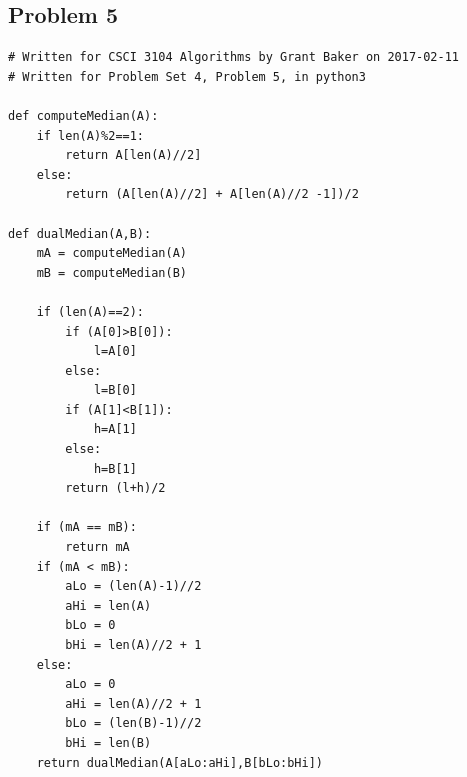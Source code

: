 \documentclass[12pt]{article}
\begin{document}
\subsection*{Problem 5}
\begin{Verbatim}[fontsize=\footnotesize]
# Written for CSCI 3104 Algorithms by Grant Baker on 2017-02-11
# Written for Problem Set 4, Problem 5, in python3

def computeMedian(A):
    if len(A)%2==1:
        return A[len(A)//2]
    else:
        return (A[len(A)//2] + A[len(A)//2 -1])/2

def dualMedian(A,B):
    mA = computeMedian(A)
    mB = computeMedian(B)

    if (len(A)==2):
        if (A[0]>B[0]):
            l=A[0]
        else:
            l=B[0]
        if (A[1]<B[1]):
            h=A[1]
        else:
            h=B[1]
        return (l+h)/2

    if (mA == mB):
        return mA
    if (mA < mB):
        aLo = (len(A)-1)//2
        aHi = len(A)
        bLo = 0
        bHi = len(A)//2 + 1
    else:
        aLo = 0
        aHi = len(A)//2 + 1
        bLo = (len(B)-1)//2
        bHi = len(B)
    return dualMedian(A[aLo:aHi],B[bLo:bHi])
\end{Verbatim}
\end{document}
